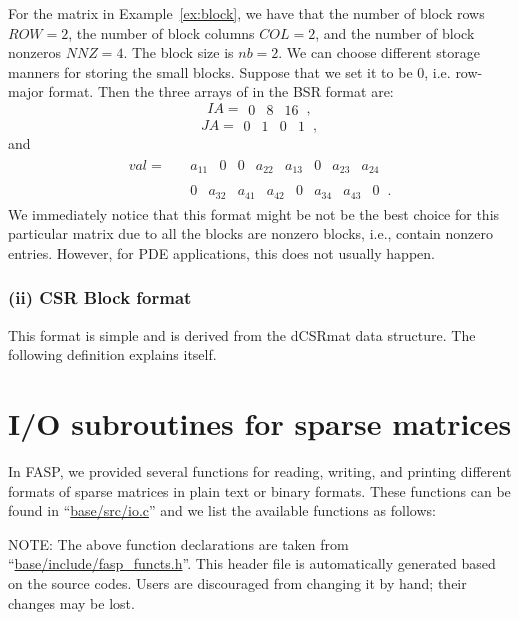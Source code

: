 \documentclass[11pt]{memoir}
\begin{document}
For the matrix in Example~\ref{ex:block}, we have that the number of block rows $ROW=2$, the number of block columns $COL=2$, and the number of block nonzeros $NNZ = 4$. The block size is $nb = 2$. We can choose different storage manners for storing the small blocks. Suppose that we set it to be 0, i.e. row-major format. Then the three arrays of in the BSR format are:
$$
IA =
\begin{array}{||c||c||c||c||}0&8&16\end{array}\, ,
$$
$$
JA =
\begin{array}{||c|c||c|c||}
0&1&0&1\end{array}\, ,
$$
and
\begin{align*}
val = \;\; &
\begin{array}{||c|c|c|c||c|c|c|c||}
a_{11} & 0 & 0 & a_{22} & a_{13} & 0 & a_{23} & a_{24}
\end{array}\,
\\
& \begin{array}{||c|c|c|c||c|c|c|c||}
0 & a_{32} & a_{41} & a_{42} & 0 & a_{34} & a_{43} & 0
\end{array}\,.
\end{align*}
We immediately notice that this format might be not be the best choice for this particular matrix due to all the blocks are nonzero blocks, i.e., contain nonzero entries. However, for PDE applications, this does not usually happen. 

\subsubsection*{(ii) CSR Block format}
This format is simple and is derived from the dCSRmat data structure. The following definition explains itself. 
%

%

\section{I/O subroutines for sparse matrices}

In FASP, we provided several functions for reading, writing, and printing different formats of sparse matrices in plain text or binary formats. These functions can be found in ``\url{base/src/io.c}'' and we list the available functions as follows:
%

%
\begin{snugshade}\noindent
  NOTE: The above function declarations are taken from
  ``\url{base/include/fasp\_functs.h}''. This header file is
  automatically generated based on the source codes. Users are discouraged
  from changing it by hand; their changes may be lost. 
\end{snugshade}
\end{document}
